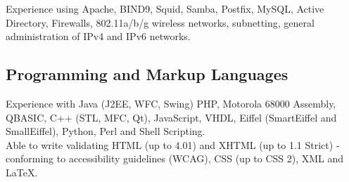 \documentclass[a4paper, 11pt] {article}
\begin{document}
Experience using Apache, BIND9, Squid, Samba, Postfix, MySQL, Active 
Directory, Firewalls, 802.11a/b/g wireless networks, subnetting, general
administration of IPv4 and IPv6 networks. 

\subsection*{Programming and Markup Languages}

Experience with Java (J2EE, WFC, Swing) PHP, Motorola 68000 Assembly, QBASIC, C++ 
(STL, MFC, Qt), JavaScript, VHDL, Eiffel (SmartEiffel and SmallEiffel),
Python, Perl and Shell Scripting. \\

Able to write validating HTML (up to 4.01) and XHTML (up 
to 1.1 Strict) - conforming to accessibility guidelines (WCAG), CSS (up to 
CSS 2), XML and LaTeX.
\end{document}
